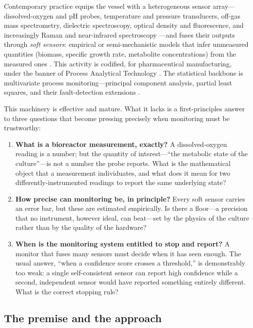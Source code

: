 \documentclass[11pt,twocolumn,a4paper]{article}
\theoremstyle{thmstyle}
\theoremstyle{definition}
\theoremstyle{remark}
\begin{document}
Contemporary practice equips the vessel with a heterogeneous sensor
array---dissolved-oxygen and pH probes, temperature and pressure
transducers, off-gas mass spectrometry, dielectric spectroscopy, optical
density and fluorescence, and increasingly Raman and near-infrared
spectroscopy \citep{lourenco2012bioreactor,sonnleitner2013automated}---and
fuses their outputs through \emph{soft sensors}: empirical or
semi-mechanistic models that infer unmeasured quantities (biomass, specific
growth rate, metabolite concentrations) from the measured ones
\citep{luttmann2012soft,mandenius2015bioprocess}. This activity is
codified, for pharmaceutical manufacturing, under the banner of Process
Analytical Technology \citep{fda2004pat}. The statistical backbone is
multivariate process monitoring---principal component analysis, partial
least squares, and their fault-detection extensions
\citep{wold1987principal,qin2012survey,venkatasubramanian2003review}.

This machinery is effective and mature. What it lacks is a first-principles
answer to three questions that become pressing precisely when monitoring
must be trustworthy:

\begin{enumerate}[leftmargin=1.6em,itemsep=3pt]
\item \textbf{What is a bioreactor measurement, exactly?} A dissolved-oxygen
reading is a number; but the quantity of interest---``the metabolic state
of the culture''---is not a number the probe reports. What is the
mathematical object that a measurement individuates, and what does it mean
for two differently-instrumented readings to report the same underlying
state?
\item \textbf{How precise can monitoring be, in principle?} Every soft
sensor carries an error bar, but these are estimated empirically. Is there
a floor---a precision that no instrument, however ideal, can beat---set by
the physics of the culture rather than by the quality of the hardware?
\item \textbf{When is the monitoring system entitled to stop and report?}
A monitor that fuses many sensors must decide when it has seen enough. The
usual answer, ``when a confidence score crosses a threshold,'' is
demonstrably too weak: a single self-consistent sensor can report high
confidence while a second, independent sensor would have reported something
entirely different. What is the correct stopping rule?
\end{enumerate}

\subsection{The premise and the approach}
\end{document}
